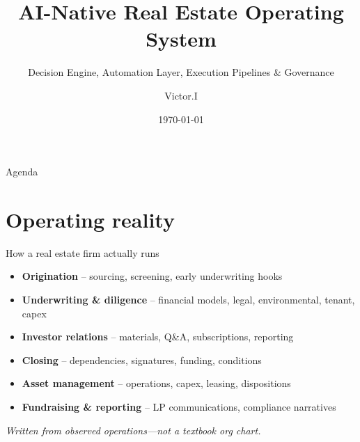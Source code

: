 \documentclass[aspectratio=169,11pt]{beamer}
\title[REOS AI]{AI-Native Real Estate Operating System}
\subtitle{Decision Engine, Automation Layer, Execution Pipelines \& Governance}
\author{Victor.I}
\date{\today}
\begin{document}
\begin{frame}
  \titlepage
\end{frame}

\begin{frame}{Agenda}
  \tableofcontents
\end{frame}

\section{Operating reality}

\begin{frame}{How a real estate firm actually runs}
  \small
  \begin{itemize}
    \item \textbf{Origination} -- sourcing, screening, early underwriting hooks
    \item \textbf{Underwriting \& diligence} -- financial models, legal, environmental, tenant, capex
    \item \textbf{Investor relations} -- materials, Q\&A, subscriptions, reporting
    \item \textbf{Closing} -- dependencies, signatures, funding, conditions
    \item \textbf{Asset management} -- operations, capex, leasing, dispositions
    \item \textbf{Fundraising \& reporting} -- LP communications, compliance narratives
  \end{itemize}
  \vspace{0.5em}
  \textit{Written from observed operations---not a textbook org chart.}
\end{frame}
\end{document}
